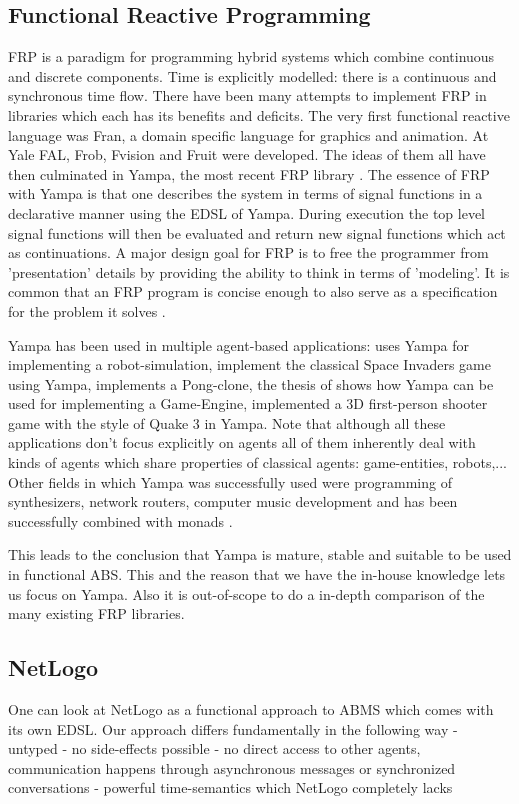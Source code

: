\subsection{Functional Reactive Programming}
FRP is a paradigm for programming hybrid systems which combine continuous and discrete components. Time is explicitly modelled: there is a continuous and synchronous time flow. There have been many attempts to implement FRP in libraries which each has its benefits and deficits. The very first functional reactive language was Fran, a domain specific language for graphics and animation. At Yale FAL, Frob, Fvision and Fruit were developed. The ideas of them all have then culminated in Yampa, the most recent FRP library \cite{nilsson_functional_2002}. The essence of FRP with Yampa is that one describes the system in terms of signal functions in a declarative manner using the EDSL of Yampa. During execution the top level signal functions will then be evaluated and return new signal functions which act as continuations. A major design goal for FRP is to free the programmer from 'presentation' details by providing the ability to think in terms of 'modeling'. It is common that an FRP program is concise enough to also serve as a specification for the problem it solves \cite{wan_functional_2000}.

Yampa has been used in multiple agent-based applications: \cite{hudak_arrows_2003} uses Yampa for implementing a robot-simulation, \cite{courtney_yampa_2003} implement the classical Space Invaders game using Yampa, \cite{nilsson_declarative_2014} implements a Pong-clone, the thesis of \cite{meisinger_game-engine-architektur_2010} shows how Yampa can be used for implementing a Game-Engine, \cite{mun_hon_functional_2005} implemented a 3D first-person shooter game with the style of Quake 3 in Yampa. Note that although all these applications don't focus explicitly on agents all of them inherently deal with kinds of agents which share properties of classical agents: game-entities, robots,... Other fields in which Yampa was successfully used were programming of synthesizers, network routers, computer music development and has been successfully combined with monads \cite{perez_functional_2016}.

This leads to the conclusion that Yampa is mature, stable and suitable to be used in functional ABS. This and the reason that we have the in-house knowledge lets us focus on Yampa. Also it is out-of-scope to do a in-depth comparison of the many existing FRP libraries.

\subsection{NetLogo}
One can look at NetLogo as a functional approach to ABMS which comes with its own EDSL. Our approach differs fundamentally in the following way
	- untyped
	- no side-effects possible
	- no direct access to other agents, communication happens through asynchronous messages or synchronized conversations
	- powerful time-semantics which NetLogo completely lacks 
